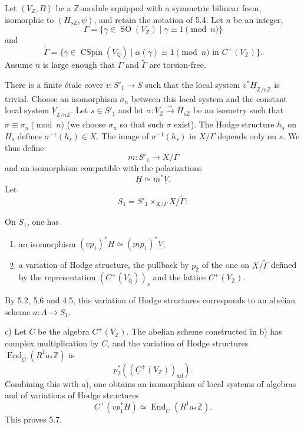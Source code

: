 \documentclass[10pt,leqno]{article}
\newcommand{\Q}{\mathbb{Q}}
\newcommand{\Z}{\mathbb{Z}}
\newcommand{\End}{\operatorname{End}}
\newcommand{\SO}{\operatorname{SO}}
\newcommand{\CSpin}{\operatorname{CSpin}}
\newcommand{\ad}{\operatorname{ad}}
\begin{document}
Let $(V_\Z,B)$ be a $\Z$-module equipped with a symmetric bilinear form, isomorphic to $(H_{s\Z},\psi)$, and retain the notation of 5.4. Let $n$ be an integer,
\[
\Gamma=\{\gamma\in\SO(V_\Z)\mid\gamma\equiv1\pmod n\}
\]
and
\[
\widetilde\Gamma=\{\gamma\in\CSpin(V_\Q)\mid\alpha(\gamma)\equiv1\pmod n\text{ in }C^+(V_\Z)\}.
\]
Assume $n$ is large enough that $\Gamma$ and $\widetilde\Gamma$ are torsion-free.

There is a finite étale cover $v:S'_1\to S$ such that the local system $v^*\underline H_{\Z/n\Z}$ is trivial. Choose an isomorphism $\sigma_n$ between this local system and the constant local system $\underline V_{\Z/n\Z}$. Let $s\in S'_1$ and let $\sigma:V_\Z\xrightarrow{\sim}H_{s\Z}$ be an isometry such that $\sigma\equiv\sigma_n\pmod n$ (we choose $\sigma_n$ so that such $\sigma$ exist). The Hodge structure $h_s$ on $H_s$ defines $\sigma^{-1}(h_s)\in X$. The image of $\sigma^{-1}(h_s)$ in $X/\Gamma$ depends only on $s$. We thus define
\[
m:S'_1\longrightarrow X/\Gamma
\]
and an isomorphism compatible with the polarizations
\[
\underline H\simeq m^*\underline V.
\]
Let
\[
S_1=S'_1\times_{X/\Gamma}X/\widetilde\Gamma:
\]
\begin{center}
\end{center}

\clearpage

On $S_1$, one has
\begin{enumerate}[label=\alph*)]
\item an isomorphism $(v p_1)^*H\simeq(m p_1)^*\underline V$;
\item a variation of Hodge structure, the pullback by $p_2$ of the one on $X/\widetilde\Gamma$ defined by the representation $(C^+(V_\Q))_s$ and the lattice $C^+(V_\Z)$.
\end{enumerate}
By 5.2, 5.6 and 4.5, this variation of Hodge structures corresponds to an abelian scheme $a:A\to S_1$.

c) Let $C$ be the algebra $C^+(V_\Z)$. The abelian scheme constructed in b) has complex multiplication by $C$, and the variation of Hodge structures $\underline{\End}_C(R^1a_*\Z)$ is
\[
p_2^*((\underline C^+(V_\Z))_{\ad}).
\]
Combining this with a), one obtains an isomorphism of local systems of algebras and of variations of Hodge structures
\[
\underline C^+(v p_1^*H)\simeq\underline{\End}_C(R^1a_*\Z).
\]
This proves 5.7.
\end{document}
